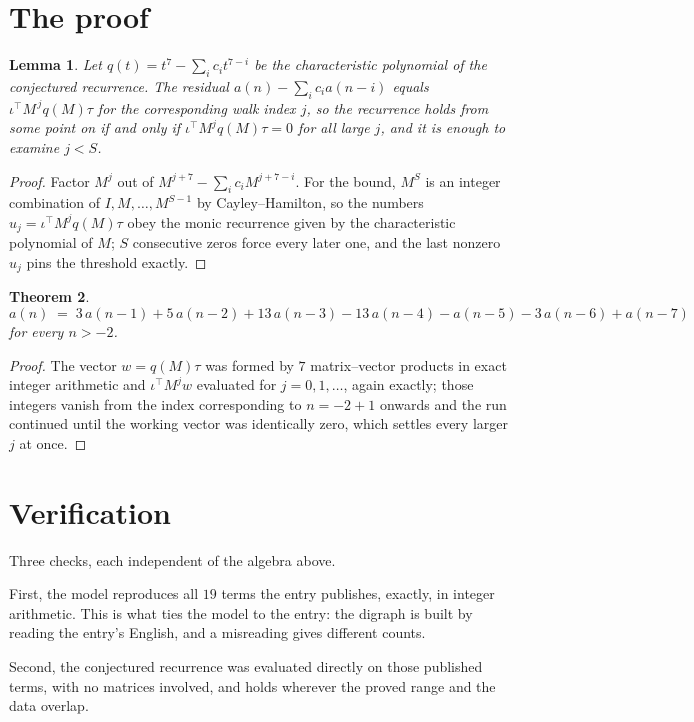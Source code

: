 \documentclass[11pt,a4paper]{article}
\theoremstyle{plain}
\newtheorem{theorem}{Theorem}
\newtheorem{lemma}[theorem]{Lemma}
\theoremstyle{definition}
\begin{document}
\section{The proof}

\begin{lemma}\label{lem:crit}
Let $q(t)=t^{7}-\sum_i c_it^{7-i}$ be the characteristic polynomial of the
conjectured recurrence. The residual $a(n)-\sum_ic_ia(n-i)$ equals
$\iota^{\!\top}M^{\,j}q(M)\tau$ for the corresponding walk index $j$, so the recurrence
holds from some point on if and only if $\iota^{\!\top}M^{j}q(M)\tau=0$ for all large $j$,
and it is enough to examine $j<S$.
\end{lemma}

\begin{proof}
Factor $M^{j}$ out of $M^{j+7}-\sum_ic_iM^{j+7-i}$. For the bound, $M^{S}$
is an integer combination of $I,M,\dots,M^{S-1}$ by Cayley--Hamilton, so the numbers
$u_j=\iota^{\!\top}M^{j}q(M)\tau$ obey the monic recurrence given by the characteristic
polynomial of $M$; $S$ consecutive zeros force every later one, and the last nonzero $u_j$
pins the threshold exactly.
\end{proof}

\begin{theorem}
\[
a(n)\;=\;3\,a(n-1) + 5\,a(n-2) + 13\,a(n-3) - 13\,a(n-4) - a(n-5) - 3\,a(n-6) + a(n-7)
\]
for every $n>-2$.
\end{theorem}

\begin{proof}
The vector $w=q(M)\tau$ was formed by $7$ matrix--vector products in exact integer
arithmetic and $\iota^{\!\top}M^{j}w$ evaluated for $j=0,1,\dots$, again exactly; those
integers vanish from the index corresponding to $n=-2+1$ onwards and the run continued
until the working vector was identically zero, which settles every larger $j$ at once.
\end{proof}

\section{Verification}

Three checks, each independent of the algebra above.

First, the model reproduces all $19$ terms the entry publishes, exactly, in integer
arithmetic. This is what ties the model to the entry: the digraph is built by reading the
entry's English, and a misreading gives different counts.

Second, the conjectured recurrence was evaluated directly on those published terms, with no
matrices involved, and holds wherever the proved range and the data overlap.
\end{document}
